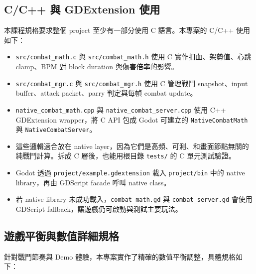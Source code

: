 \documentclass[12pt,a4paper]{article}
\begin{document}
\subsection{C/C++ 與 GDExtension 使用}
本課程規格要求整個 project 至少有一部分使用 C 語言。本專案的 C/C++ 使用如下：
\begin{itemize}[leftmargin=2em]
  \item \texttt{src/combat\_math.c} 與 \texttt{src/combat\_math.h} 使用 C 實作扣血、架勢值、心跳 clamp、BPM 對 block duration 與傷害倍率的影響。
  \item \texttt{src/combat\_mgr.c} 與 \texttt{src/combat\_mgr.h} 使用 C 管理戰鬥 snapshot、input buffer、attack packet、parry 判定與每幀 combat update。
  \item \texttt{native\_combat\_math.cpp} 與 \texttt{native\_combat\_server.cpp} 使用 C++ GDExtension wrapper，將 C API 包成 Godot 可建立的 \texttt{NativeCombatMath} 與 \texttt{NativeCombatServer}。
  \item 這些邏輯適合放在 native layer，因為它們是高頻、可測、和畫面節點無關的純戰鬥計算。拆成 C 層後，也能用根目錄 \texttt{tests/} 的 C 單元測試驗證。
  \item Godot 透過 \texttt{project/example.gdextension} 載入 \texttt{project/bin} 中的 native library，再由 GDScript facade 呼叫 native class。
  \item 若 native library 未成功載入，\texttt{combat\_math.gd} 與 \texttt{combat\_server.gd} 會使用 GDScript fallback，讓遊戲仍可啟動與測試主要玩法。
\end{itemize}

\subsection{遊戲平衡與數值詳細規格}
針對戰鬥節奏與 Demo 體驗，本專案實作了精確的數值平衡調整，具體規格如下：
\end{document}
